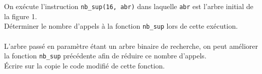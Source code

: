 \documentclass[a4paper,12pt,article,firamath]{nsi}
\begin{document}
On exécute l'instruction \texttt{nb_sup(16, abr)} dans laquelle \texttt{abr} est l'arbre initial de la figure 1.\\

\question Déterminer le nombre d'appels à la fonction \texttt{nb_sup} lors de cette exécution.\\

\\

L'arbre passé en paramètre étant un arbre binaire de recherche, on peut
améliorer la fonction \texttt{nb_sup} précédente afin de réduire ce nombre d'appels.\\

\question Écrire sur la copie le code modifié de cette fonction. 

\end{document}
